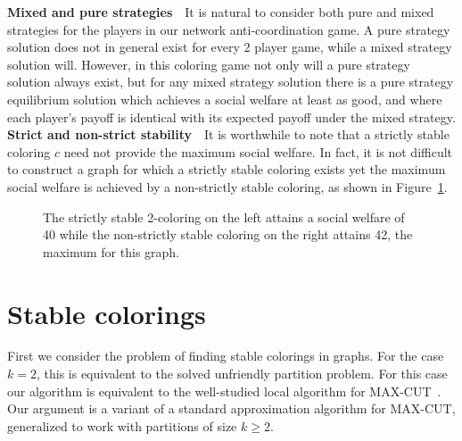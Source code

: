 \documentclass{llncs}
\begin{document}
\noindent \textbf{Mixed and pure strategies}\ \
It is natural to consider both pure and mixed strategies for the players in our
network anti-coordination game.  A pure strategy solution does not in general
exist for every 2 player game, while a mixed strategy solution will.  However,
in this coloring game not only will
a pure strategy solution always exist, but for any mixed strategy solution
there is a pure strategy equilibrium solution which achieves a social welfare
at least as good, and where each player's payoff is identical with its
expected payoff under the mixed strategy.\\

\noindent \textbf{Strict and non-strict stability}\ \
It is worthwhile to note that a strictly stable coloring $c$ need not provide
the maximum social welfare.  In fact, it is not difficult to construct a graph
for which a strictly stable coloring exists yet the maximum social welfare is
achieved by a non-strictly stable coloring, as shown in
Figure~\ref{fig:weakstrongwelfare}. 
\begin{figure}[t]
\centering
{}
\caption{The strictly stable 2-coloring on the left attains a social welfare of
40 while the non-strictly stable coloring on the right attains
42, the maximum for this graph.}
\label{fig:weakstrongwelfare}
\end{figure}

\section{Stable colorings}

First we consider the problem of finding stable colorings in graphs.  For the
case $k=2$, this is equivalent to the solved unfriendly partition problem.  For
this case our algorithm is  
equivalent to the well-studied local %
algorithm for MAX-CUT~\cite{ElsasserT11,MonienT10}.
Our argument is a variant of a standard approximation algorithm for
MAX-CUT, generalized to work with partitions of size $k \ge 2$.
\end{document}
